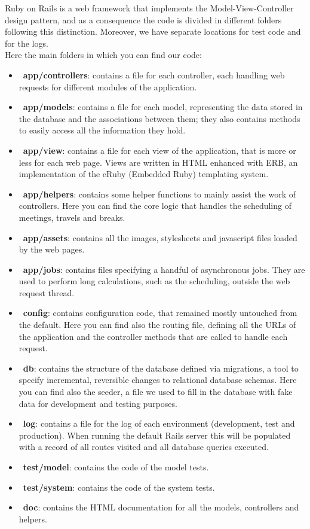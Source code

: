 Ruby on Rails is a web framework that implements the Model-View-Controller design pattern, and as a consequence the code is divided in different folders following this distinction. Moreover, we have separate locations for test code and for the logs. \\
Here the main folders in which you can find our code:

\begin{itemize}
\item~\textbf{app/controllers}: contains a file for each controller, each handling web requests for different modules of the application.
\item~\textbf{app/models}: contains a file for each model, representing the data stored in the database and the associations between them; they also contains methods to easily access all the information they hold.
\item~\textbf{app/view}: contains a file for each view of the application, that is more or less for each web page. Views are written in HTML enhanced with ERB, an implementation of the eRuby (Embedded Ruby) templating system.
\item~\textbf{app/helpers}: contains some helper functions to mainly assist the work of controllers. Here you can find the core logic that handles the scheduling of meetings, travels and breaks. 
\item~\textbf{app/assets}: contains all the images, stylesheets and javascript files loaded by the web pages.
\item~\textbf{app/jobs}: contains files specifying a handful of asynchronous jobs. They are used to perform long calculations, such as the scheduling, outside the web request thread.
\item~\textbf{config}: contains configuration code, that remained mostly untouched from the default. Here you can find also the routing file, defining all the URLs of the application and the controller methods that are called to handle each request.
\item~\textbf{db}: contains the structure of the database defined via migrations, a tool to specify incremental, reversible changes to relational database schemas. Here you can find also the seeder, a file we used to fill in the database with fake data for development and testing purposes.
\item~\textbf{log}: contains a file for the log of each environment (development, test and production). When running the default Rails server this will be populated with a record of all routes visited and all database queries executed.
\item~\textbf{test/model}: contains the code of the model tests.
\item~\textbf{test/system}: contains the code of the system tests.
\item~\textbf{doc}: contains the HTML documentation for all the models, controllers and helpers.
\end{itemize}